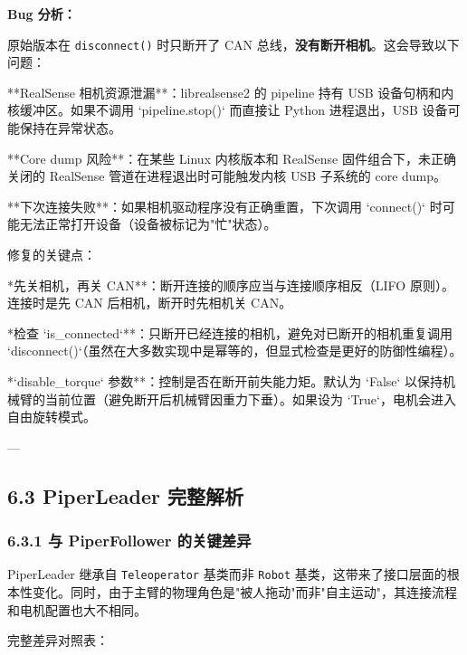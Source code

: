 \documentclass[UTF8,a4paper,11pt]{ctexart}
\begin{document}
{\textbf{Bug 分析：}

原始版本在 \texttt{disconnect()} 时只断开了 CAN 总线，\textbf{没有断开相机}。这会导致以下问题：

\item[1] **RealSense 相机资源泄漏**：librealsense2 的 pipeline 持有 USB 设备句柄和内核缓冲区。如果不调用 `pipeline.stop()` 而直接让 Python 进程退出，USB 设备可能保持在异常状态。
\item[2] **Core dump 风险**：在某些 Linux 内核版本和 RealSense 固件组合下，未正确关闭的 RealSense 管道在进程退出时可能触发内核 USB 子系统的 core dump。
\item[3] **下次连接失败**：如果相机驱动程序没有正确重置，下次调用 `connect()` 时可能无法正常打开设备（设备被标记为"忙"状态）。

修复的关键点：

\item **先关相机，再关 CAN**：断开连接的顺序应当与连接顺序相反（LIFO 原则）。连接时是先 CAN 后相机，断开时先相机关 CAN。
\item **检查 `is_connected`**：只断开已经连接的相机，避免对已断开的相机重复调用 `disconnect()`（虽然在大多数实现中是幂等的，但显式检查是更好的防御性编程）。
\item **`disable_torque` 参数**：控制是否在断开前失能力矩。默认为 `False` 以保持机械臂的当前位置（避免断开后机械臂因重力下垂）。如果设为 `True`，电机会进入自由旋转模式。

---

\subsection{6.3 PiperLeader 完整解析}

\subsubsection{6.3.1 与 PiperFollower 的关键差异}

PiperLeader 继承自 \texttt{Teleoperator} 基类而非 \texttt{Robot} 基类，这带来了接口层面的根本性变化。同时，由于主臂的物理角色是"被人拖动"而非"自主运动"，其连接流程和电机配置也大不相同。

完整差异对照表：

}
\end{document}
